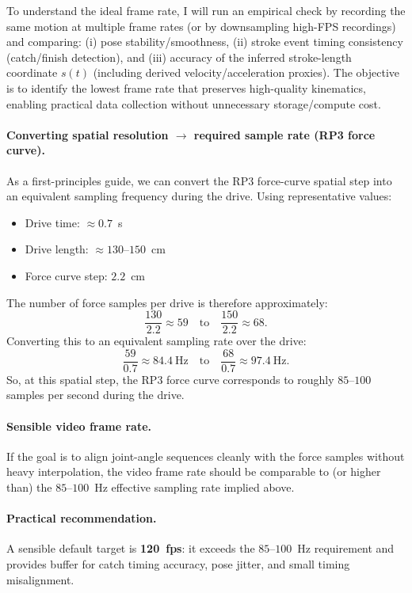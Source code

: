 \documentclass[11pt]{article}
\begin{document}
To understand the ideal frame rate, I will run an empirical check by recording the same motion at multiple frame rates (or by downsampling high-FPS recordings) and comparing: (i) pose stability/smoothness, (ii) stroke event timing consistency (catch/finish detection), and (iii) accuracy of the inferred stroke-length coordinate $s(t)$ (including derived velocity/acceleration proxies). The objective is to identify the lowest frame rate that preserves high-quality kinematics, enabling practical data collection without unnecessary storage/compute cost.

\paragraph{Converting spatial resolution $\rightarrow$ required sample rate (RP3 force curve).}
As a first-principles guide, we can convert the RP3 force-curve spatial step into an equivalent sampling frequency during the drive. Using representative values:
\begin{itemize}
	\item Drive time: $\approx 0.7$~s
	\item Drive length: $\approx 130$--$150$~cm
	\item Force curve step: $2.2$~cm
\end{itemize}
The number of force samples per drive is therefore approximately:
\[
	\frac{130}{2.2} \approx 59 \quad \text{to} \quad \frac{150}{2.2} \approx 68.
\]
Converting this to an equivalent sampling rate over the drive:
\[
	\frac{59}{0.7} \approx 84.4~\text{Hz} \quad \text{to} \quad \frac{68}{0.7} \approx 97.4~\text{Hz}.
\]
So, at this spatial step, the RP3 force curve corresponds to roughly $85$--$100$ samples per second during the drive.

\paragraph{Sensible video frame rate.}
If the goal is to align joint-angle sequences cleanly with the force samples without heavy interpolation, the video frame rate should be comparable to (or higher than) the $85$--$100$~Hz effective sampling rate implied above.

\paragraph{Practical recommendation.}
A sensible default target is \textbf{120~fps}: it exceeds the $85$--$100$~Hz requirement and provides buffer for catch timing accuracy, pose jitter, and small timing misalignment.
\end{document}
